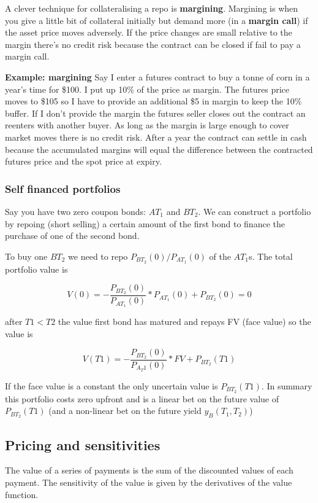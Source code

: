 A clever technique for collateralising a repo is \textbf{margining}. Margining is when you give a little bit of collateral initially but demand more (in a \textbf{margin call}) if the asset price moves adversely. If the price changes are small relative to the margin there's no credit risk because the contract can be closed if fail to pay a margin call. 

\textbf{Example: margining}
Say I enter a futures contract to buy a tonne of corn in a year's time for \$100. I put up 10\% of the price as margin.  The futures price moves to \$105 so I have to provide an additional \$5 in margin to keep the 10\% buffer. If I don't provide the margin the futures seller closes out the contract an reenters with another buyer. As long as the margin is large enough to cover market moves there is no credit risk. After a year the contract can settle in cash because the accumulated margins will equal the difference between the contracted futures price and the spot price at expiry.

\subsubsection{Self financed portfolios}

Say you have two zero coupon bonds: $AT_1$ and $BT_2$. We can construct a portfolio by repoing (short selling) a certain amount of the first bond to finance the purchase of one of the second bond. 

To buy one $BT_2$ we need to repo  $P_{BT_2}(0)/P_{AT_1}(0)$ of the $AT_1$s. The total portfolio value is

\[V(0) =  -\frac{P_{BT_2}(0)}{P_{AT_1}(0)}*P_{AT_1}(0) + P_{BT_2}(0) = 0 \]

after $T1<T2$ the value first bond has matured and repays FV (face value) so the value is

\[V(T1) = -\frac{P_{BT_2}(0)}{P_{A_T1}(0)}*FV + P_{BT_2}(T1)   \]

If the face value is a constant the only uncertain value is $P_{BT_2}(T1)$. In summary this portfolio costs zero upfront and is a linear bet on the future value of $P_{BT_2}(T1)$ (and a non-linear bet on the future yield $y_B(T_1,T_2)$)

 
\subsection{Pricing and sensitivities}

The value of a series of payments is the sum of the discounted values of each payment. The sensitivity of the value is given by the derivatives of the value function.

